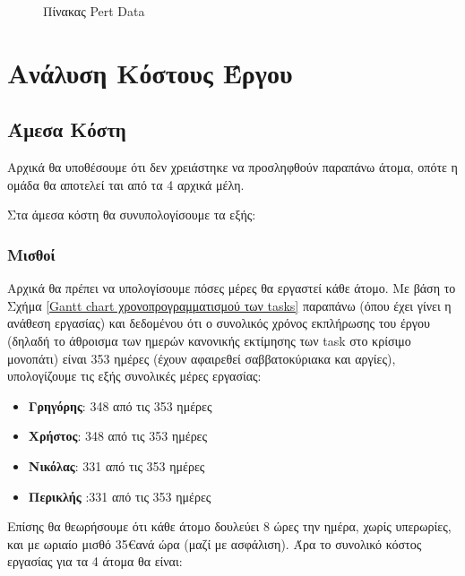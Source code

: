 \documentclass[12pt,a4paper]{article}
\begin{document}
\begin{figure}[H]
	\caption{Πίνακας Pert Data}
	\label{Πίνακας Pert Data}
\end{figure}

\section{Ανάλυση Κόστους Έργου}

\subsection{Άμεσα Κόστη}

Αρχικά θα υποθέσουμε ότι δεν χρειάστηκε να προσληφθούν παραπάνω άτομα, οπότε η ομάδα θα αποτελεί ται από τα 4 αρχικά μέλη.

Στα άμεσα κόστη θα συνυπολογίσουμε τα εξής:

\subsubsection{Μισθοί}
Αρχικά θα πρέπει να υπολογίσουμε πόσες μέρες θα εργαστεί κάθε άτομο. Με βάση το Σχήμα \ref{Gantt chart χρονοπρογραμματισμού των tasks} παραπάνω (όπου έχει γίνει η ανάθεση εργασίας) και δεδομένου ότι ο συνολικός χρόνος εκπλήρωσης του έργου (δηλαδή το άθροισμα των ημερών κανονικής εκτίμησης των task στο κρίσιμο μονοπάτι) είναι 353 ημέρες (έχουν αφαιρεθεί σαββατοκύριακα και αργίες), υπολογίζουμε τις εξής συνολικές μέρες εργασίας:

\begin{itemize}
    \item \textbf{Γρηγόρης}: 348 από τις 353 ημέρες
    \item \textbf{Χρήστος}: 348 από τις 353 ημέρες
    \item \textbf{Νικόλας}: 331 από τις 353 ημέρες
    \item \textbf{Περικλής} :331 από τις 353 ημέρες
\end{itemize}

Επίσης θα θεωρήσουμε ότι κάθε άτομο δουλεύει 8 ώρες την ημέρα, χωρίς υπερωρίες, και με ωριαίο μισθό 35\euro\space ανά ώρα (μαζί με ασφάλιση). Άρα το συνολικό κόστος εργασίας για τα 4 άτομα θα είναι:
\end{document}
